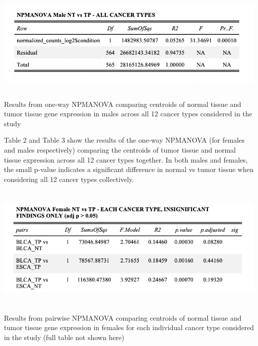 \documentclass[10pt]{article}
\begin{document}
	\begin{table}[!h]
		\centering
		\vspace{-0.2cm}\includegraphics[width=18cm, height=5cm]{allmale_npmanova.png}
		\caption{Results from one-way NPMANOVA comparing centroids of normal tissue and tumor tissue gene expression in males across all 12 cancer types considered in the study}
		\label{table:3}
	\end{table}

Table 2 and Table 3 show the results of the one-way NPMANOVA (for females and males respectively) comparing the centroids of tumor tissue and normal tissue expression across all 12 cancer types together. In both males and females, the small p-value indicates a significant difference in normal vs tumor tissue when considering all 12 cancer types collectively.
	
	\begin{table}[!h]
		\centering
		\includegraphics[width=18cm, height=6cm]{eachfemale_npmanova.png}
		\caption{Results from pairwise NPMANOVA comparing centroids of normal tissue and tumor tissue gene expression in females for each individual cancer type considered in the study (full table not shown here)}
		\label{table:4}
	\end{table}
\end{document}
